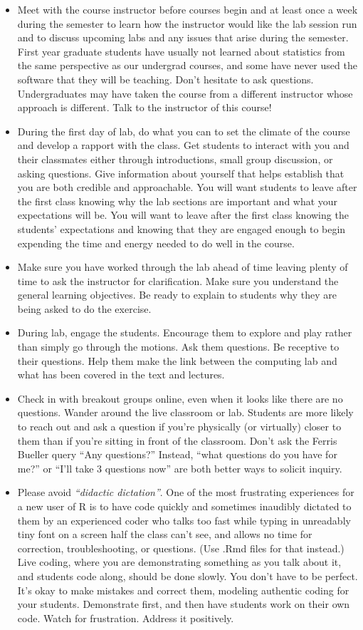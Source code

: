 \documentclass[
]{article}
\begin{document}
\begin{itemize}
\item
  Meet with the course instructor before courses begin and at least once a week during the semester to learn how the instructor would like the lab session run and to discuss upcoming labs and any issues that arise during the semester. First year graduate students have usually not learned about statistics from the same perspective as our undergrad courses, and some have never used the software that they will be teaching. Don't hesitate to ask questions. Undergraduates may have taken the course from a different instructor whose approach is different. Talk to the instructor of this course!
\item
  During the first day of lab, do what you can to set the climate of the course and develop a rapport with the class. Get students to interact with you and their classmates either through introductions, small group discussion, or asking questions. Give information about yourself that helps establish that you are both credible and approachable. You will want students to leave after the first class knowing why the lab sections are important and what your expectations will be. You will want to leave after the first class knowing the students' expectations and knowing that they are engaged enough to begin expending the time and energy needed to do well in the course.
\item
  Make sure you have worked through the lab ahead of time leaving plenty of time to ask the instructor for clarification. Make sure you understand the general learning objectives. Be ready to explain to students why they are being asked to do the exercise.
\item
  During lab, engage the students. Encourage them to explore and play rather than simply go through the motions. Ask them questions. Be receptive to their questions. Help them make the link between the computing lab and what has been covered in the text and lectures.
\item
  Check in with breakout groups online, even when it looks like there are no questions. Wander around the live classroom or lab. Students are more likely to reach out and ask a question if you're physically (or virtually) closer to them than if you're sitting in front of the classroom. Don't ask the Ferris Bueller query ``Any questions?'' Instead, ``what questions do you have for me?'' or ``I'll take 3 questions now'' are both better ways to solicit inquiry.
\item
  Please avoid \emph{``didactic dictation''}. One of the most frustrating experiences for a new user of R is to have code quickly and sometimes inaudibly dictated to them by an experienced coder who talks too fast while typing in unreadably tiny font on a screen half the class can't see, and allows no time for correction, troubleshooting, or questions. (Use .Rmd files for that instead.) Live coding, where you are demonstrating something as you talk about it, and students code along, should be done slowly. You don't have to be perfect. It's okay to make mistakes and correct them, modeling authentic coding for your students. Demonstrate first, and then have students work on their own code. Watch for frustration. Address it positively.

\end{itemize}
\end{document}
